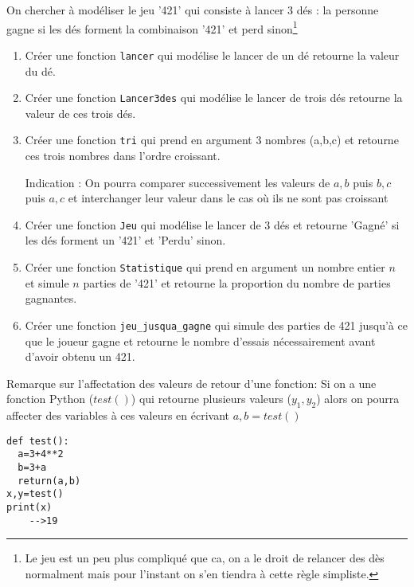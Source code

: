 \documentclass[a4paper, 11pt,reqno]{article}
\begin{document}
\begin{exercice}
On chercher à modéliser le jeu '421' qui consiste à lancer 3 dés : la personne gagne si les dés forment la combinaison '421' et perd sinon\footnote{Le jeu est un peu plus compliqué que ca, on a le droit de relancer des dès normalment mais pour l'instant on s'en tiendra à cette règle simpliste.}

\begin{enumerate}
\item Créer une fonction \texttt{lancer} qui modélise le lancer de un dé retourne la valeur du dé.
\item Créer une fonction \texttt{Lancer3des} qui modélise le lancer de trois dés retourne la valeur de ces trois dés.
\item Créer une fonction \texttt{tri} qui prend en argument 3 nombres (a,b,c) et retourne ces trois nombres dans l'ordre croissant. 

\footnotesize{Indication :  On pourra comparer successivement les valeurs de $a,b$ puis $b,c$ puis $a,c$ et interchanger leur valeur dans le cas où ils ne sont pas croissant}

\item Créer une fonction \texttt{Jeu} qui modélise le lancer de 3 dés et retourne 'Gagné' si les dés forment un '421' et 'Perdu' sinon.
\item Créer une fonction \texttt{Statistique} qui prend en argument un nombre entier $n$ et simule $n$ parties de '421' et retourne la proportion du nombre de parties gagnantes.
\item Créer une fonction \texttt{jeu\_jusqua\_gagne} qui simule des parties de 421 jusqu'à ce que le joueur gagne et retourne le nombre d'essais nécessairement avant d'avoir obtenu un 421.


\end{enumerate}


Remarque sur l'affectation des valeurs de retour d'une fonction:
Si on a une fonction Python ($test()$) qui retourne plusieurs valeurs ($y_1,y_2$) alors on pourra affecter des variables à ces valeurs en écrivant 
$a,b =test()$

\begin{lstlisting}
def test():
  a=3+4**2
  b=3+a
  return(a,b)
x,y=test()
print(x)
	-->19
\end{lstlisting}




\end{exercice}
\end{document}
